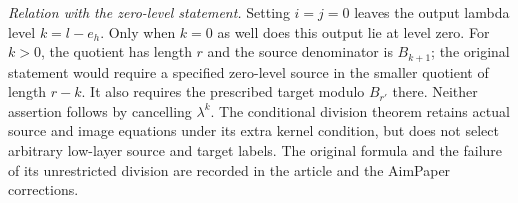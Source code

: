 \begin{theorem}
\textit{Relation with the zero-level statement.}
Setting $i=j=0$ leaves the output lambda level $k=l-e_h$.
Only when $k=0$ as well does this output lie at level zero.
For $k>0$, the quotient has length $r$ and the source denominator
is $B_{k+1}$; the original statement would require a specified
zero-level source in the smaller quotient of length $r-k$.
It also requires the prescribed target modulo $B_{r'}$ there.
Neither assertion follows by cancelling $\lambda^k$.
The conditional division theorem retains actual source and image
equations under its extra kernel condition, but does not select
arbitrary low-layer source and target labels.
The original formula and the failure of its unrestricted division
are recorded in the article and the AimPaper corrections.
\sketch
{}
\end{theorem}
